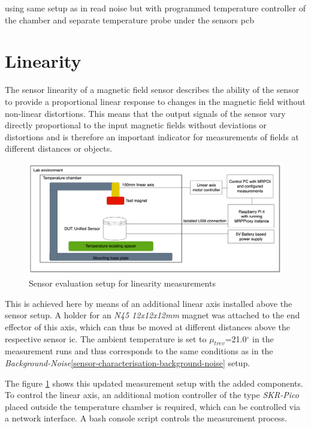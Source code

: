 using same setup as in read noise but with programmed temperature
controller of the chamber and separate temperature probe under the
sensors pcb

\hypertarget{linearity}{%
\section{Linearity}\label{linearity}}

The sensor linearity of a magnetic field sensor describes the ability of
the sensor to provide a proportional linear response to changes in the
magnetic field without non-linear distortions. This means that the
output signals of the sensor vary directly proportional to the input
magnetic fields without deviations or distortions and is therefore an
important indicator for measurements of fields at different distances or
objects.

\begin{figure}
\centering
\includegraphics{./generated_images/border_Sensor_evaluation_setup_for_linearity_measurements.png}
\caption{Sensor evaluation setup for linearity measurements
\label{Sensor_evaluation_setup_for_linearity_measurements.png}}
\end{figure}

This is achieved here by means of an additional linear axis installed
above the sensor setup. A holder for an \emph{N45 12x12x12mm} magnet was
attached to the end effector of this axis, which can thus be moved at
different distances above the respective sensor \gls{ic}. The ambient
temperature is set to \(\mu_{trev}\)=21.0\(^{\circ}\) in the measurement
runs and thus corresponds to the same conditions as in the
\emph{Background-Noise}\ref{sensor-characterisation-background-noise}
setup.

The figure \ref{Sensor_evaluation_setup_for_linearity_measurements.png}
shows this updated measurement setup with the added components. To
control the linear axis, an additional motion controller of the type
\emph{SKR-Pico} placed outside the temperature chamber is required,
which can be controlled via a network interface. A bash console script
controls the measurement process.

